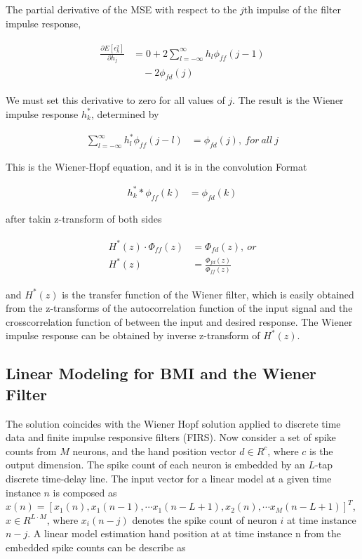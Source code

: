 \documentclass[8pt,a4paper]{article}
\begin{document}
\begin{multicols}{2}
The partial derivative of the MSE with respect to the $j$th impulse of the filter impulse response, 

\begin{align}
  \begin{split}
  \frac{ \partial E \left[ \epsilon_{k}^{2} \right]  }{ \partial h_{j} } &= 0 + 2 \sum_{l=-\infty}^{\infty} h_{l} \phi_{ff}(j-1) \\
  &\quad -2 \phi_{fd}(j)
  \end{split}
\end{align}

We must set this derivative to zero for all values of $j$. The result is the Wiener impulse response $h_{k}^{*}$, determined by

\begin{align}
  \sum_{l=-\infty}^{\infty} h_{l}^{*} \phi_{ff}(j-l) &= \phi_{fd}(j),\ for\ all\ j
\end{align}

This is the Wiener-Hopf equation, and it is in the convolution Format

\begin{align}
  h_{k}^{*} * \phi_{ff}(k) &= \phi_{fd}(k)
\end{align}

after takin z-transform of both sides

\begin{align}
  \begin{split}
    H^{*}(z) \cdot \Phi_{ff}(z) &= \Phi_{fd}(z),\ or \\
    H^{*}(z) &= \frac{ \Phi_{fd}(z) }{ \Phi_{ff}(z)  }
  \end{split}
\end{align}

and $H^{*}(z)$ is the transfer function of the Wiener filter, which is easily obtained from the z-transforms of the autocorrelation function of the input signal and the crosscorrelation function of between the input and desired response. 
The Wiener impulse response can be obtained by inverse z-transform of $H^{*}(z)$.

\subsection*{Linear Modeling for BMI and the Wiener Filter}
The solution coincides with the Wiener Hopf solution applied to discrete time data and finite impulse responsive filters (FIRS)\cite{sanchez2007}. 
Now consider a set of spike counts from $M$ neurons, and the hand position vector $d \in R^c $, where $c$ is the output dimension. 
The spike count of each neuron is embedded by an $L$-tap discrete time-delay line. 
The input vector for a linear model at a given time instance $n$ is composed as $x(n)=\left[ x_{1}(n), x_{1}(n-1), \cdots x_{1}(n-L+1), x_{2}(n), \cdots x_{M}(n-L+1) \right]^T $, 
$x\in R^{L \cdot M}$, where $x_{i}(n-j)$ denotes the spike count of neuron $i$ at time instance $n-j$. A linear model estimation hand position at at time instance n from the embedded spike counts can be describe as


\end{multicols}
\end{document}
